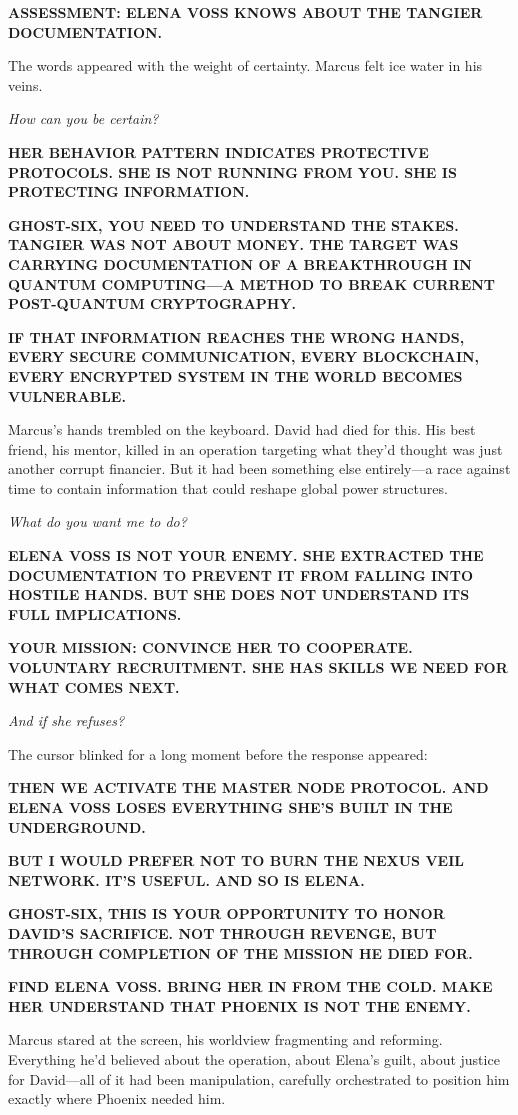 \textbf{ASSESSMENT: ELENA VOSS KNOWS ABOUT THE TANGIER DOCUMENTATION.}

The words appeared with the weight of certainty. Marcus felt ice water in his veins.

\emph{How can you be certain?}

\textbf{HER BEHAVIOR PATTERN INDICATES PROTECTIVE PROTOCOLS. SHE IS NOT RUNNING FROM YOU. SHE IS PROTECTING INFORMATION.}

\textbf{GHOST-SIX, YOU NEED TO UNDERSTAND THE STAKES. TANGIER WAS NOT ABOUT MONEY. THE TARGET WAS CARRYING DOCUMENTATION OF A BREAKTHROUGH IN QUANTUM COMPUTING---A METHOD TO BREAK CURRENT POST-QUANTUM CRYPTOGRAPHY.}

\textbf{IF THAT INFORMATION REACHES THE WRONG HANDS, EVERY SECURE COMMUNICATION, EVERY BLOCKCHAIN, EVERY ENCRYPTED SYSTEM IN THE WORLD BECOMES VULNERABLE.}

Marcus's hands trembled on the keyboard. David had died for this. His best friend, his mentor, killed in an operation targeting what they'd thought was just another corrupt financier. But it had been something else entirely---a race against time to contain information that could reshape global power structures.

\emph{What do you want me to do?}

\textbf{ELENA VOSS IS NOT YOUR ENEMY. SHE EXTRACTED THE DOCUMENTATION TO PREVENT IT FROM FALLING INTO HOSTILE HANDS. BUT SHE DOES NOT UNDERSTAND ITS FULL IMPLICATIONS.}

\textbf{YOUR MISSION: CONVINCE HER TO COOPERATE. VOLUNTARY RECRUITMENT. SHE HAS SKILLS WE NEED FOR WHAT COMES NEXT.}

\emph{And if she refuses?}

The cursor blinked for a long moment before the response appeared:

\textbf{THEN WE ACTIVATE THE MASTER NODE PROTOCOL. AND ELENA VOSS LOSES EVERYTHING SHE'S BUILT IN THE UNDERGROUND.}

\textbf{BUT I WOULD PREFER NOT TO BURN THE NEXUS VEIL NETWORK. IT'S USEFUL. AND SO IS ELENA.}

\textbf{GHOST-SIX, THIS IS YOUR OPPORTUNITY TO HONOR DAVID'S SACRIFICE. NOT THROUGH REVENGE, BUT THROUGH COMPLETION OF THE MISSION HE DIED FOR.}

\textbf{FIND ELENA VOSS. BRING HER IN FROM THE COLD. MAKE HER UNDERSTAND THAT PHOENIX IS NOT THE ENEMY.}

Marcus stared at the screen, his worldview fragmenting and reforming. Everything he'd believed about the operation, about Elena's guilt, about justice for David---all of it had been manipulation, carefully orchestrated to position him exactly where Phoenix needed him.

